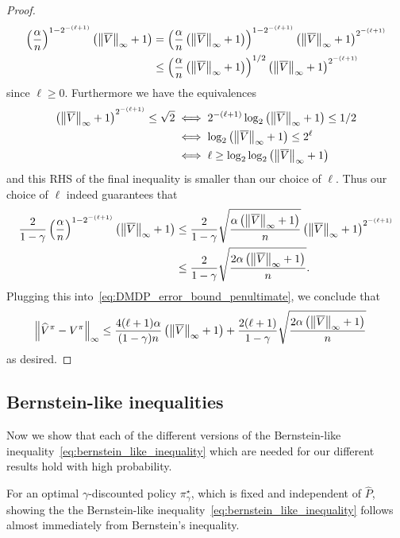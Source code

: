 \documentclass{article}
\theoremstyle{plain}
\theoremstyle{plain}
\theoremstyle{remark}
\theoremstyle{plain}
\theoremstyle{plain}
\newcommand{\Phat}{\widehat{P}}
\newcommand{\Vhat}{\widehat{V}}
\newcommand{\pistar}{\pi^\star}
\newcommand{\Vc}{\overline{V}}
\begin{document}
\begin{proof}
\begin{align*}
    \left(\frac{\alpha}{n}\right)^{1-2^{-(\ell+1)}} \left( \infnorm{\Vc} + 1\right) &= \left(\frac{\alpha}{n} \left( \infnorm{\Vc} + 1\right)\right)^{1-2^{-(\ell+1)}} \left( \infnorm{\Vc} + 1\right)^{2^{-(\ell+1)}} \\
    &\leq  \left(\frac{\alpha}{n} \left( \infnorm{\Vc} + 1\right)\right)^{1/2} \left( \infnorm{\Vc} + 1\right)^{2^{-(\ell+1)}}
\end{align*}
since $\ell \geq 0$. Furthermore we have the equivalences
\begin{align*}
    \left( \infnorm{\Vc} + 1\right)^{2^{-(\ell+1)}} \leq \sqrt{2} & \iff 2^{-(\ell+1)} \log_2 \left( \infnorm{\Vc} + 1\right) \leq 1/2 \\
    & \iff \log_2 \left( \infnorm{\Vc} + 1\right) \leq 2^{\ell} \\
    & \iff \ell \geq  \log_2 \log_2 \left( \infnorm{\Vc} + 1\right) 
\end{align*}
and this RHS of the final inequality is smaller than our choice of $\ell$. Thus our choice of $\ell $ indeed guarantees that
\begin{align*}
    \frac{2}{1-\gamma} \left(\frac{\alpha}{n}\right)^{1-2^{-(\ell+1)}} \left( \infnorm{\Vc} + 1\right) &\leq \frac{2}{1-\gamma} \sqrt{\frac{\alpha \left( \infnorm{\Vc} + 1\right)}{n}}  \left( \infnorm{\Vc} + 1\right)^{2^{-(\ell+1)}} \\
    &\leq \frac{2}{1-\gamma} \sqrt{\frac{2\alpha \left( \infnorm{\Vc} + 1\right)}{n}}.
\end{align*}
Plugging this into~\eqref{eq:DMDP_error_bound_penultimate}, we conclude that
\begin{align*}
    \infnorm{ \Vhat^\pi - V^\pi} &\leq \frac{4 (\ell + 1) \alpha}{(1-\gamma)n} \left( \infnorm{\Vc} + 1\right) + \frac{2(\ell + 1)}{1-\gamma} \sqrt{\frac{2 \alpha \left( \infnorm{\Vc} + 1\right)}{n}} 
\end{align*}
as desired.
\end{proof}

\subsection{Bernstein-like inequalities}
\label{sec:DMDP_bernstein_bounds}
Now we show that each of the different versions of the Bernstein-like inequality~\eqref{eq:bernstein_like_inequality} which are needed for our different results hold with high probability.

For an optimal $\gamma$-discounted policy $\pistar_\gamma$, which is fixed and independent of $\Phat$, showing the the Bernstein-like inequality~\eqref{eq:bernstein_like_inequality} follows almost immediately from Bernstein's inequality.
\end{document}
